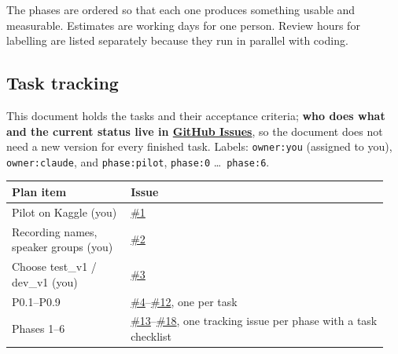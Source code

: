 \documentclass[11pt]{article}
\begin{document}
{\small\setlength{\parskip}{0pt}\setcounter{tocdepth}{1}\tableofcontents}
\bigskip
The phases are ordered so that each one produces something usable and measurable. Estimates are working days for one person. Review hours for labelling are listed separately because they run in parallel with coding.

\hypertarget{task-tracking}{%
\subsection*{Task tracking}\label{task-tracking}}
This document holds the tasks and their acceptance criteria; \textbf{who does what and the current status live in \href{https://github.com/mattobryan/transcribe/issues}{GitHub Issues}}, so the document does not need a new version for every finished task. Labels: \texttt{owner:you} (assigned to you), \texttt{owner:claude}, and \texttt{phase:pilot}, \texttt{phase:0} \ldots\ \texttt{phase:6}.

\begin{longtable}[]{@{}>{\raggedright\arraybackslash}p{0.3\linewidth}>{\raggedright\arraybackslash}p{0.65\linewidth}@{}}
\toprule\noalign{}
Plan item & Issue \\
\midrule\noalign{}
\endhead
\bottomrule\noalign{}
\endlastfoot
Pilot on Kaggle (you) & \href{https://github.com/mattobryan/transcribe/issues/1}{\#1} \\
Recording names, speaker groups (you) & \href{https://github.com/mattobryan/transcribe/issues/2}{\#2} \\
Choose test\_v1 / dev\_v1 (you) & \href{https://github.com/mattobryan/transcribe/issues/3}{\#3} \\
P0.1--P0.9 & \href{https://github.com/mattobryan/transcribe/issues/4}{\#4}--\href{https://github.com/mattobryan/transcribe/issues/12}{\#12}, one per task \\
Phases 1--6 & \href{https://github.com/mattobryan/transcribe/issues/13}{\#13}--\href{https://github.com/mattobryan/transcribe/issues/18}{\#18}, one tracking issue per phase with a task checklist \\
\end{longtable}
\end{document}
